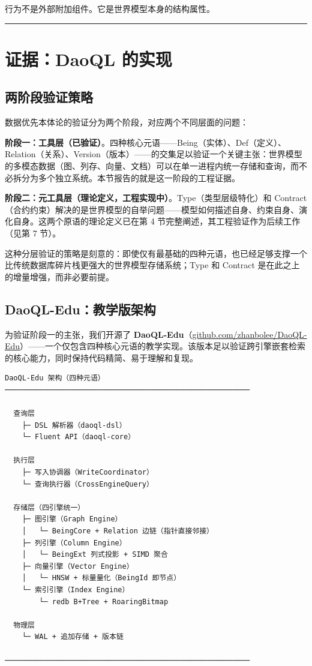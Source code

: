 \documentclass[11pt,a4paper]{ctexart}
\begin{document}
行为不是外部附加组件。它是世界模型本身的结构属性。

\begin{center}\rule{0.5\linewidth}{0.5pt}\end{center}

\section{证据：DaoQL
的实现}\label{ux8bc1ux636edaoql-ux7684ux5b9eux73b0}

\subsection{两阶段验证策略}\label{ux4e24ux9636ux6bb5ux9a8cux8bc1ux7b56ux7565}

数据优先本体论的验证分为两个阶段，对应两个不同层面的问题：

\textbf{阶段一：工具层（已验证）}。四种核心元语------Being（实体）、Def（定义）、Relation（关系）、Version（版本）------的交集足以验证一个关键主张：世界模型的多模态数据（图、列存、向量、文档）可以在单一进程内统一存储和查询，而不必拆分为多个独立系统。本节报告的就是这一阶段的工程证据。

\textbf{阶段二：元工具层（理论定义，工程实现中）}。Type（类型层级特化）和
Contract（合约约束）解决的是世界模型的自举问题------模型如何描述自身、约束自身、演化自身。这两个原语的理论定义已在第
4 节完整阐述，其工程验证作为后续工作（见第 7 节）。

这种分层验证的策略是刻意的：即使仅有最基础的四种元语，也已经足够支撑一个比传统数据库碎片栈更强大的世界模型存储系统；Type
和 Contract 是在此之上的增量增强，而非必要前提。

\subsection{DaoQL-Edu：教学版架构}\label{daoql-eduux6559ux5b66ux7248ux67b6ux6784}

为验证阶段一的主张，我们开源了
\textbf{DaoQL-Edu}（\href{https://github.com/zhanbolee/DaoQL-Edu}{github.com/zhanbolee/DaoQL-Edu}）------一个仅包含四种核心元语的教学实现。该版本足以验证跨引擎嵌套检索的核心能力，同时保持代码精简、易于理解和复现。

\begin{verbatim}
DaoQL-Edu 架构（四种元语）
─────────────────────────────────────────────────────────

  查询层
    ├─ DSL 解析器（daoql-dsl）
    └─ Fluent API（daoql-core）

  执行层
    ├─ 写入协调器（WriteCoordinator）
    └─ 查询执行器（CrossEngineQuery）

  存储层（四引擎统一）
    ├─ 图引擎（Graph Engine）
    │   └─ BeingCore + Relation 边链（指针直接邻接）
    ├─ 列引擎（Column Engine）
    │   └─ BeingExt 列式投影 + SIMD 聚合
    ├─ 向量引擎（Vector Engine）
    │   └─ HNSW + 标量量化（BeingId 即节点）
    └─ 索引引擎（Index Engine）
        └─ redb B+Tree + RoaringBitmap

  物理层
    └─ WAL + 追加存储 + 版本链

─────────────────────────────────────────────────────────
\end{verbatim}
\end{document}
